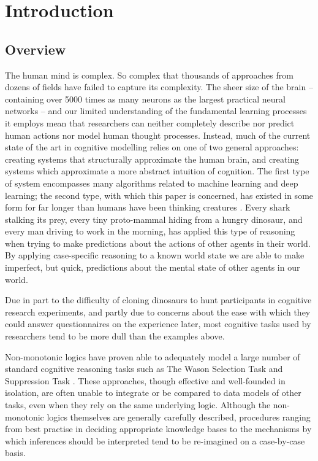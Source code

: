 \chapter{Introduction} \label{chp:intro}
\section{Overview} \label{sec:overview}
The human mind is complex. So complex that thousands of approaches from dozens of fields have failed to capture its complexity. The sheer size of the brain -- containing  over 5000 times as many neurons as the largest practical neural networks \citep{mocanu2018scalable} -- and our limited understanding of the fundamental learning processes it employs mean that researchers can neither completely describe nor predict human actions nor model human thought processes. Instead, much of the current state of the art in cognitive modelling relies on one of two general approaches: creating systems that structurally approximate the human brain, and creating systems which approximate a more abstract intuition of cognition. The first type of system encompasses many algorithms related to machine learning and deep learning; the second type, with which this paper is concerned, has existed in some form for far longer than humans have been thinking creatures \citep{smirnova2015crows}. Every shark stalking its prey, every tiny proto-mammal hiding from a hungry dinosaur, and every man driving to work in the morning, has applied this type of reasoning when trying to make predictions about the actions of other agents in their world. By applying case-specific reasoning to a known world state we are able to make imperfect, but quick, predictions about the mental state of other agents in our world.

Due in part to the difficulty of cloning dinosaurs to hunt participants in cognitive research experiments, and partly due to concerns about the ease with which they could answer questionnaires on the experience later, most cognitive tasks used by researchers tend to be more dull than the examples above.

Non-monotonic logics have proven able to adequately model a large number of standard cognitive reasoning tasks such as The Wason Selection Task\citep{wason1968reasoning} and Suppression Task \citep{byrne1989suppressing}. These approaches, though effective and well-founded in isolation, are often unable to integrate or be compared to data models of other tasks, even when they rely on the same underlying logic. Although the non-monotonic logics themselves are generally carefully described, procedures ranging from best practise in deciding appropriate knowledge bases to the mechanisms by which inferences should be interpreted tend to be re-imagined on a case-by-case basis.

